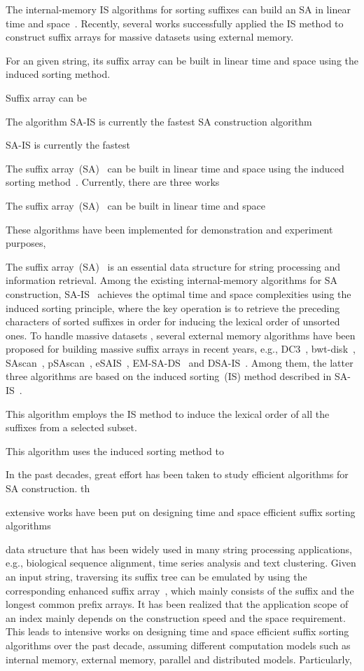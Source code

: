 \documentclass[10pt,journal,compsoc]{IEEEtran}
\begin{document}
The internal-memory IS algorithms for sorting suffixes can build an SA in linear time and space~\cite{Nong11}. Recently, several works successfully applied the IS method to construct suffix arrays for massive datasets using external memory.

For an given string, its suffix array can be built in linear time and space using the induced sorting method.  


Suffix array can be 


The algorithm SA-IS is currently the fastest SA construction algorithm 

SA-IS is currently the fastest 


The suffix array~(SA)~\cite{Manber1993} can be built in linear time and space using the induced sorting method~\cite{Nong11}. Currently, there are three works  


The suffix array~(SA)~\cite{Manber1993} can be built in linear time and space 

These algorithms have been implemented for demonstration and experiment purposes, 


The suffix array~(SA)~\cite{Manber1993} is an essential data structure for string processing and information retrieval. Among the existing internal-memory algorithms for SA construction, SA-IS~\cite{Nong11} achieves the optimal time and space complexities using the induced sorting principle, where the key operation is to retrieve the preceding characters of sorted suffixes in order for inducing the lexical order of unsorted ones. To handle massive datasets , several external memory algorithms have been proposed for building massive suffix arrays in recent years, e.g., DC3~\cite{Dementiev2008a}, bwt-disk~\cite{Ferragina2012}, SAscan~\cite{Karkkainen2014}, pSAscan~\cite{Karkkainen2015}, eSAIS~\cite{Bingmann2013}, EM-SA-DS~\cite{Nong2014} and DSA-IS~\cite{Nong2015}. Among them, the latter three algorithms are based on the induced sorting~(IS) method described in SA-IS~\cite{Nong2011}.


 This algorithm employs the IS method to induce the lexical order of all the suffixes from a selected subset. 

 This algorithm uses the induced sorting method to 

In the past decades, great effort has been taken to study efficient algorithms for SA construction. th

extensive works have been put on designing time and space efficient suffix sorting algorithms

data structure that has been widely used in many string processing applications, e.g., biological sequence alignment, time series analysis and text clustering. Given an input string, traversing its suffix tree can be emulated by using the corresponding enhanced suffix array~\cite{Abouelhodaa2004}, which mainly consists of the suffix and the longest common prefix arrays. It has been realized that the application scope of an index mainly depends on the construction speed and the space requirement. This leads to intensive works on designing time and space efficient suffix sorting algorithms over the past decade, assuming different computation models such as internal memory, external memory, parallel and distributed models. Particularly, 
\end{document}
